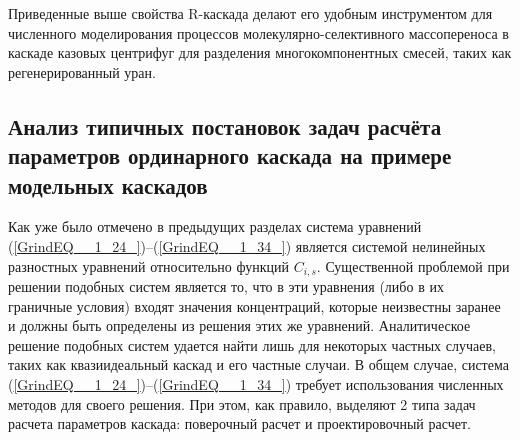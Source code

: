 Приведенные выше свойства R-каскада делают его удобным инструментом для численного моделирования процессов молекулярно-селективного массопереноса в каскаде казовых центрифуг для разделения многокомпонентных смесей, таких как регенерированный уран. 

\subsection{Анализ типичных постановок задач расчёта параметров ординарного каскада на примере модельных каскадов}\label{part2_discrep}

Как уже было отмечено в предыдущих разделах система уравнений (\ref{GrindEQ__1_24_})--(\ref{GrindEQ__1_34_}) является системой нелинейных разностных уравнений относительно функций $C_{i,s}$. Существенной проблемой при решении подобных систем является то, что в эти уравнения (либо в их граничные условия) входят значения концентраций, которые неизвестны заранее и должны быть определены из решения этих же уравнений. Аналитическое решение подобных систем удается найти лишь для некоторых частных случаев, таких как квазиидеальный каскад и его частные случаи. В общем случае, система (\ref{GrindEQ__1_24_})--(\ref{GrindEQ__1_34_}) требует использования численных методов для своего решения. При этом, как правило, выделяют 2 типа задач расчета параметров каскада: поверочный расчет и проектировочный расчет.

